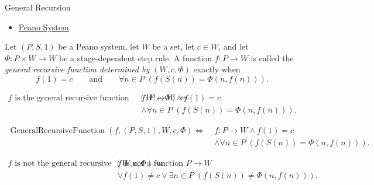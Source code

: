 \begin{topicbox}{General Recursion}
\begin{dependencies}
\begin{itemize}
  \item \hyperref[def:peano-system]{Peano System}
\end{itemize}
\end{dependencies}

\begin{tcolorbox}[colback=defbox, colframe=defborder, arc=2pt,
  left=6pt, right=6pt, top=4pt, bottom=4pt,
  title={\small\textbf{Definition (General Recursive Function)}},
  fonttitle=\small\bfseries]
\begin{definition}
\label{def:general-recursive-function}
Let $(P,S,1)$ be a Peano system, let $W$ be a set, let $c\in W$, and let
$\Phi:P\times W\to W$ be a stage-dependent step rule. A function $f:P\to W$
is called the \emph{general recursive function determined by $(W,c,\Phi)$}
exactly when
\[
f(1)=c
\qquad\text{and}\qquad
\forall n\in P\;(f(S(n))=\Phi(n,f(n))).
\]
\end{definition}
\end{tcolorbox}

\begin{remark*}
\[
\begin{aligned}
f \text{ is the general recursive function determined by } (W,c,\Phi)
\Longleftrightarrow\;&
f:P\to W\land f(1)=c\\
&\land \forall n\in P\;(f(S(n))=\Phi(n,f(n))).
\end{aligned}
\]
\end{remark*}

\begin{remark*}
\[
\begin{aligned}
\operatorname{GeneralRecursiveFunction}(f,(P,S,1),W,c,\Phi)
\Longleftrightarrow\;&
f:P\to W\land f(1)=c\\
&\land \forall n\in P\;(f(S(n))=\Phi(n,f(n))).
\end{aligned}
\]
\end{remark*}

\begin{remark*}
\[
\begin{aligned}
f \text{ is not the general recursive function determined by } (W,c,\Phi)
\Longleftrightarrow\;&
f \text{ is not a function } P\to W\\
&\lor f(1)\neq c
\lor \exists n\in P\;(f(S(n))\neq \Phi(n,f(n))).
\end{aligned}
\]
\end{remark*}


\end{topicbox}
